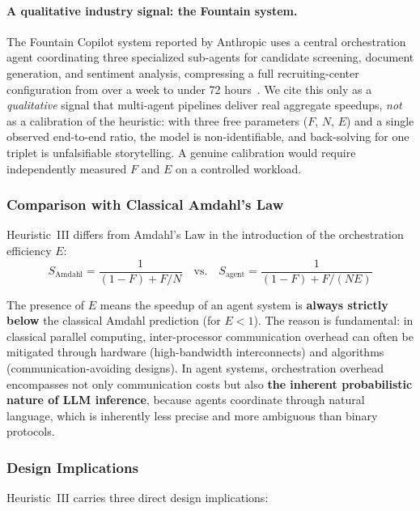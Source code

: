 \paragraph{A qualitative industry signal: the Fountain system.}
The Fountain Copilot system reported by Anthropic uses a central orchestration agent coordinating three specialized sub-agents for candidate screening, document generation, and sentiment analysis, compressing a full recruiting-center configuration from over a week to under 72 hours~\cite{anthropic2026agenticreport}. We cite this only as a \emph{qualitative} signal that multi-agent pipelines deliver real aggregate speedups, \emph{not} as a calibration of the heuristic: with three free parameters ($F$, $N$, $E$) and a single observed end-to-end ratio, the model is non-identifiable, and back-solving for one triplet is unfalsifiable storytelling. A genuine calibration would require independently measured $F$ and $E$ on a controlled workload.

\subsubsection{Comparison with Classical Amdahl's Law}

Heuristic~III differs from Amdahl's Law in the introduction of the orchestration efficiency $E$:
\begin{equation}
S_{\mathrm{Amdahl}} = \frac{1}{(1-F) + F/N} \quad \text{vs.} \quad S_{\mathrm{agent}} = \frac{1}{(1-F) + F/(NE)}
\end{equation}

The presence of $E$ means the speedup of an agent system is \textbf{always strictly below} the classical Amdahl prediction (for $E < 1$). The reason is fundamental: in classical parallel computing, inter-processor communication overhead can often be mitigated through hardware (high-bandwidth interconnects) and algorithms (communication-avoiding designs). In agent systems, orchestration overhead encompasses not only communication costs but also \textbf{the inherent probabilistic nature of LLM inference}, because agents coordinate through natural language, which is inherently less precise and more ambiguous than binary protocols.

\subsubsection{Design Implications}

Heuristic~III carries three direct design implications:

